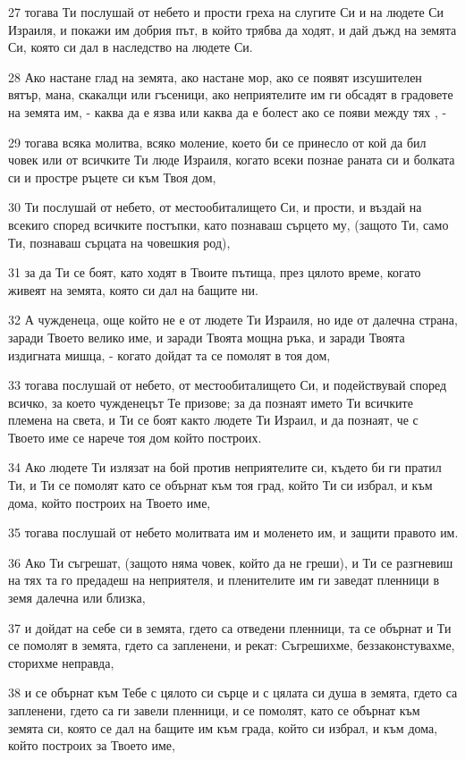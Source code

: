 \par 27 тогава Ти послушай от небето и прости греха на слугите Си и на людете Си Израиля, и покажи им добрия път, в който трябва да ходят, и дай дъжд на земята Си, която си дал в наследство на людете Си.
\par 28 Ако настане глад на земята, ако настане мор, ако се появят изсушителен вятър, мана, скакалци или гъсеници, ако неприятелите им ги обсадят в градовете на земята им, - каква да е язва или каква да е болест ако се появи между тях , -
\par 29 тогава всяка молитва, всяко моление, което би се принесло от кой да бил човек или от всичките Ти люде Израиля, когато всеки познае раната си и болката си и простре ръцете си към Твоя дом,
\par 30 Ти послушай от небето, от местообиталището Си, и прости, и въздай на всекиго според всичките постъпки, като познаваш сърцето му, (защото Ти, само Ти, познаваш сърцата на човешкия род),
\par 31 за да Ти се боят, като ходят в Твоите пътища, през цялото време, когато живеят на земята, която си дал на бащите ни.
\par 32 А чужденеца, още който не е от людете Ти Израиля, но иде от далечна страна, заради Твоето велико име, и заради Твоята мощна ръка, и заради Твоята издигната мишца, - когато дойдат та се помолят в тоя дом,
\par 33 тогава послушай от небето, от местообиталището Си, и подействувай според всичко, за което чужденецът Те призове; за да познаят името Ти всичките племена на света, и Ти се боят както людете Ти Израил, и да познаят, че с Твоето име се нарече тоя дом който построих.
\par 34 Ако людете Ти излязат на бой против неприятелите си, където би ги пратил Ти, и Ти се помолят като се обърнат към тоя град, който Ти си избрал, и към дома, който построих на Твоето име,
\par 35 тогава послушай от небето молитвата им и моленето им, и защити правото им.
\par 36 Ако Ти съгрешат, (защото няма човек, който да не греши), и Ти се разгневиш на тях та го предадеш на неприятеля, и пленителите им ги заведат пленници в земя далечна или близка,
\par 37 и дойдат на себе си в земята, гдето са отведени пленници, та се обърнат и Ти се помолят в земята, гдето са запленени, и рекат: Съгрешихме, беззаконстувахме, сторихме неправда,
\par 38 и се обърнат към Тебе с цялото си сърце и с цялата си душа в земята, гдето са запленени, гдето са ги завели пленници, и се помолят, като се обърнат към земята си, която се дал на бащите им към града, който си избрал, и към дома, който построих за Твоето име,
